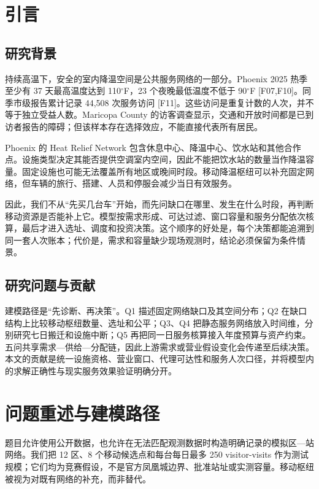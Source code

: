 \documentclass[12pt]{article}
\begin{document}
\clearpage
\section{引言}

\subsection{研究背景}
持续高温下，安全的室内降温空间是公共服务网络的一部分。Phoenix 2025 热季至少有 37 天最高温度达到 110$^\circ$F，23 个夜晚最低温度不低于 90$^\circ$F [F07,F10]\citep{phoenixplan}。同季市级报告累计记录 44,508 次服务访问 [F11]\citep{weeklyreport}。这些访问是重复计数的人次，并不等于独立受益人数。Maricopa County 的访客调查显示，交通和开放时间都是已到访者报告的障碍；但该样本存在选择效应，不能直接代表所有居民\citep{maricopasurvey}。

Phoenix 的 Heat Relief Network 包含休息中心、降温中心、饮水站和其他合作点。设施类型决定其能否提供空调室内空间，因此不能把饮水站的数量当作降温容量\citep{phoenixplan}。固定设施也可能无法覆盖所有地区或晚间时段。移动降温枢纽可以补充固定网络，但车辆的旅行、搭建、人员和停服会减少当日有效服务。

因此，我们不从“先买几台车”开始，而先问缺口在哪里、发生在什么时段，再判断移动资源是否能补上它。模型按需求形成、可达过滤、窗口容量和服务分配依次核算，最后才进入选址、调度和投资决策。这个顺序的好处是，每个决策都能追溯到同一套人次账本；代价是，需求和容量缺少现场观测时，结论必须保留为条件情景。

\subsection{研究问题与贡献}
建模路径是“先诊断、再决策”。Q1 描述固定网络缺口及其空间分布；Q2 在缺口结构上比较移动枢纽数量、选址和公平；Q3、Q4 把静态服务网络放入时间维，分别研究七日搬迁和设施中断；Q5 再把同一日服务核算接入年度预算与资产约束。五问共享需求—供给—分配链，因此上游需求或营业假设变化会传递至后续决策。本文的贡献是统一设施资格、营业窗口、代理可达性和服务人次口径，并将模型内的求解正确性与现实服务效果验证明确分开。

\section{问题重述与建模路径}
题目允许使用公开数据，也允许在无法匹配观测数据时构造明确记录的模拟区—站网络。我们把 12 区、8 个移动候选点和每台每日最多 250 visitor-visits 作为测试规模；它们均为竞赛假设，不是官方凤凰城边界、批准站址或实测容量\citep{mcm2027b}。移动枢纽被视为对既有网络的补充，而非替代。
\end{document}
